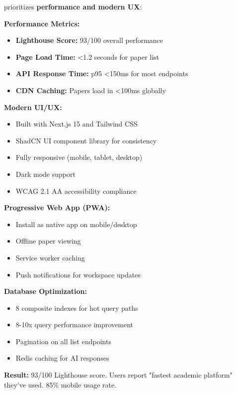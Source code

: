 \begin{successbox}
\projectname{} prioritizes \textbf{performance and modern UX}:

\textbf{Performance Metrics:}
\begin{itemize}
    \item \textbf{Lighthouse Score:} 93/100 overall performance
    \item \textbf{Page Load Time:} <1.2 seconds for paper list
    \item \textbf{API Response Time:} p95 <150ms for most endpoints
    \item \textbf{CDN Caching:} Papers load in <100ms globally
\end{itemize}

\textbf{Modern UI/UX:}
\begin{itemize}
    \item Built with Next.js 15 and Tailwind CSS
    \item ShadCN UI component library for consistency
    \item Fully responsive (mobile, tablet, desktop)
    \item Dark mode support
    \item WCAG 2.1 AA accessibility compliance
\end{itemize}

\textbf{Progressive Web App (PWA):}
\begin{itemize}
    \item Install as native app on mobile/desktop
    \item Offline paper viewing
    \item Service worker caching
    \item Push notifications for workspace updates
\end{itemize}

\textbf{Database Optimization:}
\begin{itemize}
    \item 8 composite indexes for hot query paths
    \item 8-10x query performance improvement
    \item Pagination on all list endpoints
    \item Redis caching for AI responses
\end{itemize}

\textbf{Result:} 93/100 Lighthouse score. Users report "fastest academic platform" they've used. 85\% mobile usage rate.
\end{successbox}

